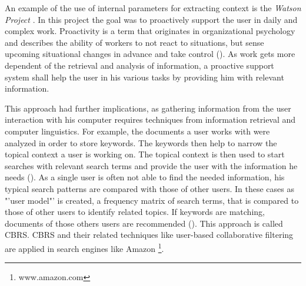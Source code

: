 An example of the use of internal parameters for extracting context is the \textit{Watson Project} \cite{budzik2000user} . In this project the goal was to proactively support the user in daily and complex work. Proactivity is a term that  originates in organizational psychology and describes the ability of workers to not react to situations, but sense upcoming situational changes in advance and take control (\cite{grant2008dynamics}). As work gets more dependent of the retrieval and analysis of information, a proactive support system shall help the user in his various tasks by providing him with relevant information. 

This approach had further implications, as gathering information from the user interaction with his computer requires techniques from information retrieval and computer linguistics. For example, the documents a user works with were analyzed in order to store keywords. The keywords then help to narrow the topical context a user is working on. The topical context is then used to start searches with relevant search terms and provide the user with the information he needs (\cite{budzik2000user}). As a single user is often not able to find the needed information, his typical search patterns are compared with those of other users. In these cases as "'user model"' is created, a frequency matrix of search terms, that is compared to those of other users to identify related topics. If keywords are matching, documents of those others users are recommended (\cite{anand2007contextual}). This approach is called \ac{CBRS}. \acs{CBRS} and their related techniques like user-based collaborative filtering are applied in search engines like Amazon \footnote{www.amazon.com}.

